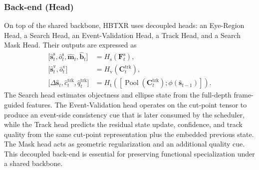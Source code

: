 \documentclass[journal]{IEEEtran}
\begin{document}
\subsubsection{Back-end (Head)}
On top of the shared backbone, HBTXR uses decoupled heads: an Eye-Region Head, a Search Head, an Event-Validation Head, a Track Head, and a Search Mask Head. Their outputs are expressed as
\begin{align}
\big[\hat{\mathbf s}_t^{\mathrm{s}},\hat o_t^{\mathrm{s}},\hat{\mathbf m}_t,\hat{\mathbf b}_t\big]
&= H_{\mathrm{s}}\!\left(\mathbf F_t^{\mathrm{s}}\right),
\\
\big[\hat{\mathbf s}_t^{\mathrm{v}},\hat o_t^{\mathrm{v}}\big]
&= H_{\mathrm{v}}\!\left(\mathbf C_t^{\mathrm{trk}}\right),
\\
\big[\Delta\hat{\mathbf s}_t,\hat c_t^{\mathrm{trk}},\hat q_t^{\mathrm{trk}}\big]
&= H_{\mathrm{t}}\!\left([\operatorname{Pool}(\mathbf C_t^{\mathrm{trk}});\phi(\bar{\mathbf s}_{t-1})]\right).
\end{align}
The Search head estimates objectness and ellipse state from the full-depth frame-guided features. The Event-Validation head operates on the cut-point tensor to produce an event-side consistency cue that is later consumed by the scheduler, while the Track head predicts the residual state update, confidence, and track quality from the same cut-point representation plus the embedded previous state. The Mask head acts as geometric regularization and an additional quality cue. This decoupled back-end is essential for preserving functional specialization under a shared backbone.
\end{document}
